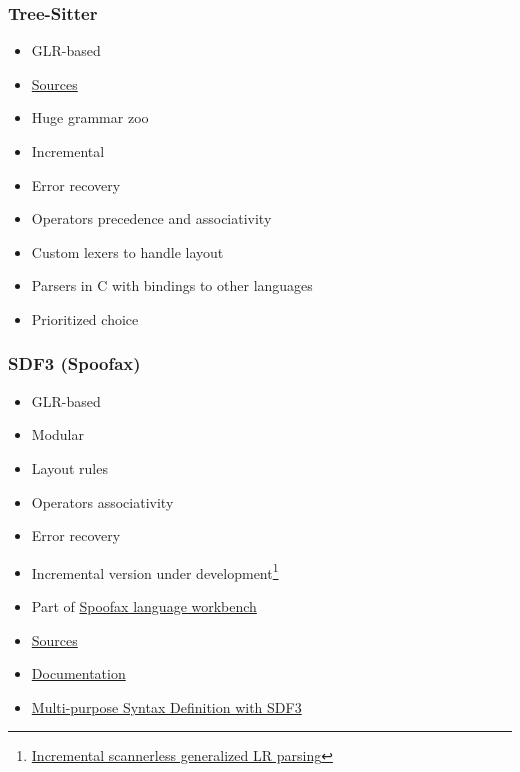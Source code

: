 \documentclass[xcolor=table,aspectratio=169]{beamer}
\begin{document}
\begin{frame}[fragile]
  \frametitle{Tree-Sitter}
  \begin{itemize}
    \item GLR-based
    \item \href{https://github.com/tree-sitter/tree-sitter}{Sources}
    \item[\faPlus] Huge grammar zoo
    \item[\faPlus] Incremental
    \item[\faPlus] Error recovery
    \item[\faPlus] Operators precedence  and associativity
    \item[\faMinus] Custom lexers to handle layout
    \item[\faMinus] Parsers in C with bindings to other languages  
    \item[\faMinus] Prioritized choice 
  \end{itemize}    
\end{frame}


\begin{frame}[fragile]
  \frametitle{SDF3 (Spoofax)}
  \begin{itemize}
    \item GLR-based
    \item[\faPlus] Modular
    \item[\faPlus] Layout rules
    \item[\faPlus] Operators associativity
    \item[\faMinus\faQuestion] Error recovery
    \item Incremental version under development\footnote{\href{https://dl.acm.org/doi/abs/10.1145/3359061.3361085}{Incremental scannerless generalized LR parsing}}
  \end{itemize}  
  
  \begin{itemize}
    \item Part of \href{https://www.spoofax.dev/}{Spoofax language workbench}
    \item \href{https://github.com/metaborg/sdf}{Sources}
    \item \href{https://www.spoofax.dev/references/syntax/}{Documentation}
    \item \href{https://link.springer.com/chapter/10.1007/978-3-030-58768-0_1}{Multi-purpose Syntax Definition with SDF3}
  \end{itemize}  
  
\end{frame}
\end{document}
